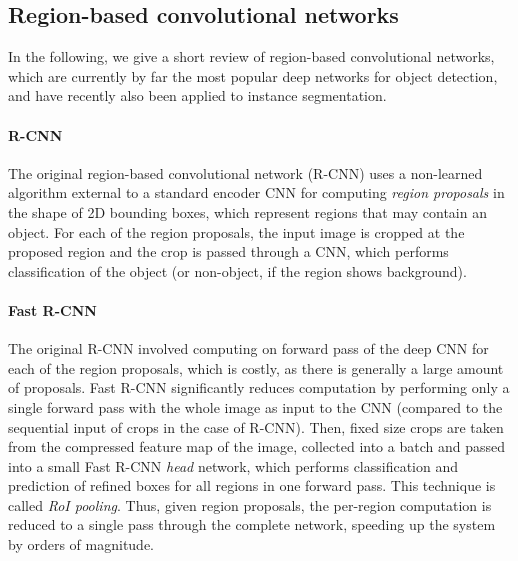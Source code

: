 


\subsection{Region-based convolutional networks}
In the following, we give a short review of region-based convolutional networks, which are currently by far the
most popular deep networks for object detection, and have recently also been applied to instance segmentation.

\paragraph{R-CNN}
The original region-based convolutional network (R-CNN) \cite{RCNN} uses a non-learned algorithm external to a standard encoder CNN
for computing \emph{region proposals} in the shape of 2D bounding boxes, which represent regions that may contain an object.
For each of the region proposals, the input image is cropped at the proposed region and the crop is
passed through a CNN, which performs classification of the object (or non-object, if the region shows background). %

\paragraph{Fast R-CNN}
The original R-CNN involved computing on forward pass of the deep CNN for each of the region proposals,
which is costly, as there is generally a large amount of proposals.
Fast R-CNN \cite{FastRCNN} significantly reduces computation by performing only a single forward pass with the whole image
as input to the CNN (compared to the sequential input of crops in the case of R-CNN).
Then, fixed size crops are taken from the compressed feature map of the image,
collected into a batch and passed into a small Fast R-CNN
\emph{head} network, which performs classification and prediction of refined boxes for all regions in one forward pass.
This technique is called \emph{RoI pooling}. %
Thus, given region proposals, the per-region computation is reduced to a single pass through the complete network,
speeding up the system by orders of magnitude. %

